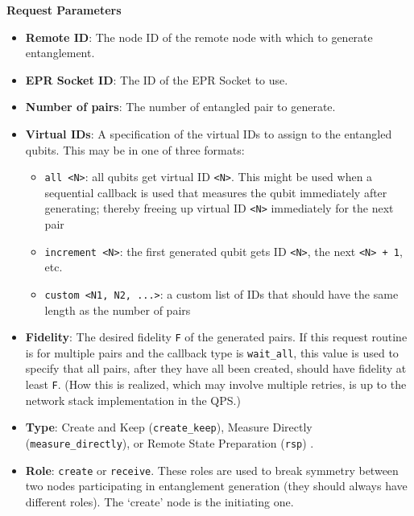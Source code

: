 \textbf{Request Parameters}
\begin{itemize}
\item \textbf{Remote ID}: The node ID of the remote node with which to generate entanglement.
\item \textbf{EPR Socket ID}: The ID of the EPR Socket to use.
\item \textbf{Number of pairs}: The number of entangled pair to generate.
\item \textbf{Virtual IDs}: A specification of the virtual IDs to assign to the entangled qubits. This may be in one of three formats:
\begin{itemize}
  \item \texttt{all <N>}: all qubits get virtual ID \texttt{<N>}. This might be used when a sequential callback is used that measures the qubit immediately after generating; thereby freeing up virtual ID \texttt{<N>} immediately for the next pair
  \item \texttt{increment <N>}: the first generated qubit gets ID \texttt{<N>}, the next \texttt{<N> + 1}, etc.
  \item \texttt{custom <N1, N2, ...>}: a custom list of IDs that should have the same length as the number of pairs
\end{itemize}
\item \textbf{Fidelity}: The desired fidelity \texttt{F} of the generated pairs.
If this request routine is for multiple pairs and the callback type is \texttt{wait\_all}, this value is used to specify that all pairs, after they have all been created, should have fidelity at least \texttt{F}. (How this is realized, which may involve multiple retries, is up to the network stack implementation in the QPS.)
\item \textbf{Type}: Create and Keep (\texttt{create\_keep}), Measure Directly (\texttt{measure\_directly}), or Remote State Preparation (\texttt{rsp}) \cite{dahlberg2019link}.
\item \textbf{Role}: \texttt{create} or \texttt{receive}. These roles are used to break symmetry between two nodes participating in entanglement generation (they should always have different roles). The `create' node is the initiating one.

\end{itemize}




